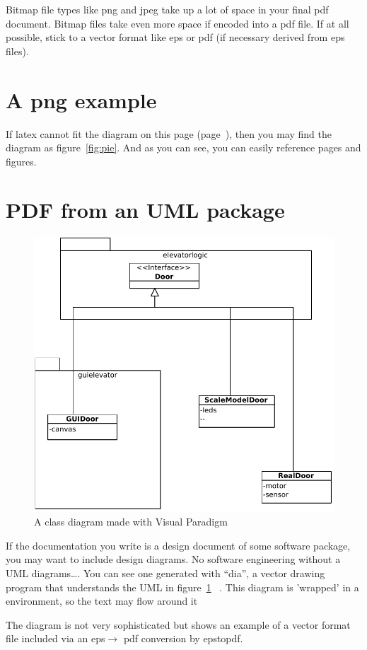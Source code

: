 Bitmap file types like png and jpeg take up a lot of space in your
final pdf document. 
Bitmap files take even more space if encoded into a pdf file.
If at all possible, stick to a vector format like eps or pdf (if
necessary derived from eps files). 


\section{A png example}
\label{page:pngexample}
If latex cannot fit the diagram on this page
(page~\pageref{page:pngexample}), 
 then you may find the diagram as figure~\vref{fig:pie}. And as you
 can see, you can easily reference pages and figures.

\section{PDF from an UML package} 
\begin{figure}

  \includegraphics[width=.4\textwidth]{figures/doorsystem.pdf}
  \caption{A class diagram made with Visual Paradigm}
  \label{fig:classdiagram}
\end{figure}
If the documentation you write is a design document of some software
package, you may want to include design diagrams.
No software engineering without a UML diagrams\ldots.
You can see one generated with ``dia'', a vector drawing program that
understands the UML in figure~\ref{fig:classdiagram}
~. This diagram is 'wrapped' in a  environment, so the text may flow around it

The diagram is not very sophisticated but shows an example of a vector
format file included via an eps$\rightarrow$ pdf conversion by
epstopdf.

